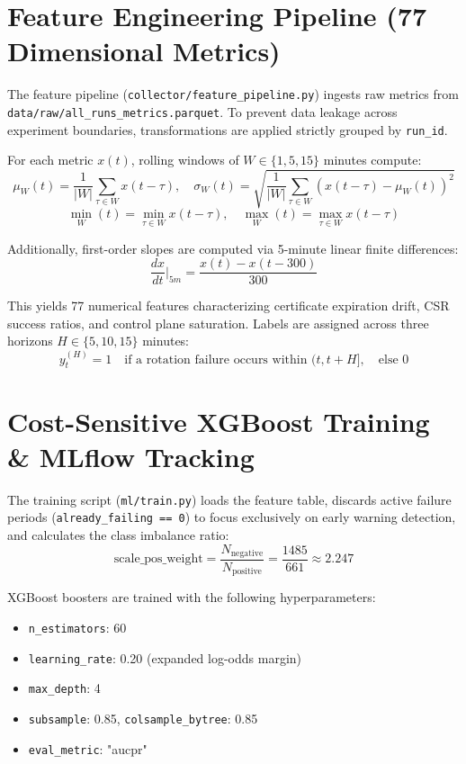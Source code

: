 \documentclass[12pt,a4paper]{report}
\newcommand{\code}[1]{\texttt{\small #1}}
\begin{document}
\section{Feature Engineering Pipeline (77 Dimensional Metrics)}
The feature pipeline (\code{collector/feature\_pipeline.py}) ingests raw metrics from \code{data/raw/all\_runs\_metrics.parquet}. To prevent data leakage across experiment boundaries, transformations are applied strictly grouped by \code{run\_id}.

For each metric $x(t)$, rolling windows of $W \in \{1, 5, 15\}$ minutes compute:
$$\mu_{W}(t) = \frac{1}{|W|} \sum_{\tau \in W} x(t - \tau), \quad \sigma_{W}(t) = \sqrt{\frac{1}{|W|} \sum_{\tau \in W} (x(t - \tau) - \mu_{W}(t))^2}$$
$$\min_{W}(t) = \min_{\tau \in W} x(t - \tau), \quad \max_{W}(t) = \max_{\tau \in W} x(t - \tau)$$

Additionally, first-order slopes are computed via 5-minute linear finite differences:
$$\frac{dx}{dt}\Big|_{5m} = \frac{x(t) - x(t - 300)}{300}$$

This yields 77 numerical features characterizing certificate expiration drift, CSR success ratios, and control plane saturation. Labels are assigned across three horizons $H \in \{5, 10, 15\}$ minutes:
$$y_t^{(H)} = 1 \quad \text{if a rotation failure occurs within } (t, t + H], \quad \text{else } 0$$

\section{Cost-Sensitive XGBoost Training \& MLflow Tracking}
The training script (\code{ml/train.py}) loads the feature table, discards active failure periods (\code{already\_failing == 0}) to focus exclusively on early warning detection, and calculates the class imbalance ratio:
$$\text{scale\_pos\_weight} = \frac{N_{\text{negative}}}{N_{\text{positive}}} = \frac{1485}{661} \approx 2.247$$

XGBoost boosters are trained with the following hyperparameters:
\begin{itemize}
    \item \code{n\_estimators}: 60
    \item \code{learning\_rate}: 0.20 (expanded log-odds margin)
    \item \code{max\_depth}: 4
    \item \code{subsample}: 0.85, \code{colsample\_bytree}: 0.85
    \item \code{eval\_metric}: "aucpr"
\end{itemize}
\end{document}
